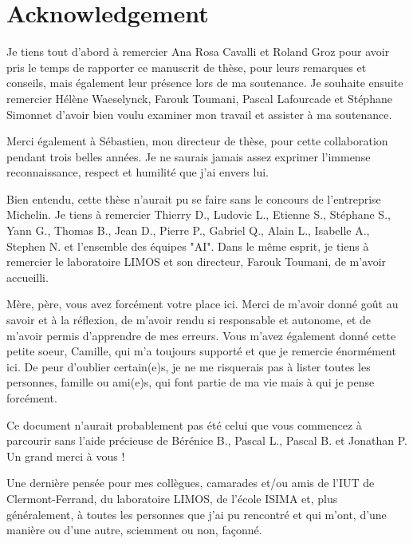 %
\chapter*{Acknowledgement}
\label{sec:acknowledgement}
\vspace*{-10mm}

Je tiens tout d'abord à remercier Ana Rosa Cavalli et Roland Groz
pour avoir pris le temps de rapporter ce manuscrit de thèse, pour
leurs remarques et conseils, mais également leur présence lors de
ma soutenance. Je souhaite ensuite remercier Hélène Waeselynck,
Farouk Toumani, Pascal Lafourcade et Stéphane Simonnet d'avoir
bien voulu examiner mon travail et assister à ma soutenance.

Merci également à Sébastien, mon directeur de thèse, pour cette
collaboration pendant trois belles années. Je ne saurais jamais
assez exprimer l'immense reconnaissance, respect et humilité que
j'ai envers lui.

Bien entendu, cette thèse n'aurait pu se faire sans le concours
de l'entreprise Michelin. Je tiens à remercier Thierry D.,
Ludovic L., Etienne S., Stéphane S., Yann G., Thomas B., Jean D.,
Pierre P., Gabriel Q., Alain L., Isabelle A., Stephen N. et
l'ensemble des équipes "AI". Dans le même esprit, je tiens à
remercier le laboratoire LIMOS et son directeur, Farouk Toumani,
de m'avoir accueilli.

Mère, père, vous avez forcément votre place ici. Merci de m'avoir
donné goût au savoir et à la réflexion, de m'avoir rendu si
responsable et autonome, et de m'avoir permis d'apprendre de mes
erreurs. Vous m'avez également donné cette petite soeur, Camille,
qui m'a toujours supporté et que je remercie énormément ici. De
peur d'oublier certain(e)s, je ne me risquerais pas à lister
toutes les personnes, famille ou ami(e)s, qui font partie de ma
vie mais à qui je pense forcément.

Ce document n'aurait probablement pas été celui que vous
commencez à parcourir sans l'aide précieuse de Bérénice B.,
Pascal L., Pascal B. et Jonathan P. Un grand merci à vous !

Une dernière pensée pour mes collègues, camarades et/ou amis de
l'IUT de Clermont-Ferrand, du laboratoire LIMOS, de l'école ISIMA
et, plus généralement, à toutes les personnes que j'ai pu
rencontré et qui m'ont, d'une manière ou d'une autre, sciemment
ou non, façonné.

